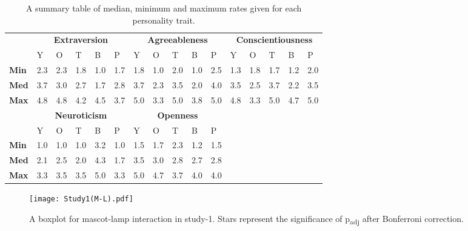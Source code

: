 \begin{table}[H]
    \renewcommand{\arraystretch}{1}
    \begin{center}
        \begin{tabular}{p{}|
        p{}|p{}|p{}|p{}|p{}||
        p{}|p{}|p{}|p{}|p{}||
        p{}|p{}|p{}|p{}|p{}|}
            \cline{2-16}
            & \multicolumn{5}{c||}{\textbf{Extraversion}} & \multicolumn{5}{c||}{\textbf{Agreeableness}}
            & \multicolumn{5}{c|}{\textbf{Conscientiousness}} \\
            \cline{2-16}
            & Y & O & T & B & P & Y & O & T & B & P & Y & O & T & B & P     \\
            \cline{2-16}
            \textbf{Min}    & 2.3 & 2.3 & 1.8 & 1.0 & 1.7 & 1.8 & 1.0 & 2.0 & 1.0 & 2.5 & 1.3 & 1.8 & 1.7 & 1.2 & 2.0  \\
            \textbf{Med}    & 3.7 & 3.0 & 2.7 & 1.7 & 2.8 & 3.7 & 2.3 & 3.5 & 2.0 & 4.0 & 3.5 & 2.5 & 3.7 & 2.2 & 3.5  \\
            \textbf{Max}    & 4.8 & 4.8 & 4.2 & 4.5 & 3.7 & 5.0 & 3.3 & 5.0 & 3.8 & 5.0 & 4.8 & 3.3 & 5.0 & 4.7 & 5.0 \\
            \cline{2-16}
            \cline{2-11}
            &  \multicolumn{5}{|c||}{\textbf{Neuroticism}} & \multicolumn{5}{|c||}{\textbf{Openness}} \\
            \cline{2-11}
            & Y & O & T & B & P & Y & O & T & B & P            \\
            \cline{2-11}
            \textbf{Min}    & 1.0 & 1.0 & 1.0 & 3.2 & 1.0 & 1.5 & 1.7 & 2.3 & 1.2 & 1.5    \\
            \textbf{Med}    & 2.1 & 2.5 & 2.0 & 4.3 & 1.7 & 3.5 & 3.0 & 2.8 & 2.7 & 2.8    \\
            \textbf{Max}    & 3.3 & 3.5 & 3.5 & 5.0 & 3.3 & 5.0 & 4.7 & 3.7 & 4.0 & 4.0    \\
            \cline{2-11}
        \end{tabular}
        \caption[]{A summary table of median, minimum and maximum rates given for each personality trait.\footnotemark}
        \label{table:medianML1}
    \end{center}
\end{table}

\begin{figure}[H]
    \centering
    \texttt{[image: Study1(M-L).pdf]}
    \caption[]{A boxplot for mascot-lamp interaction in study-1.
    Stars represent the significance of p\textsubscript{adj} after Bonferroni correction.\footnotemark}
    \label{fig:ML1}
\end{figure}

